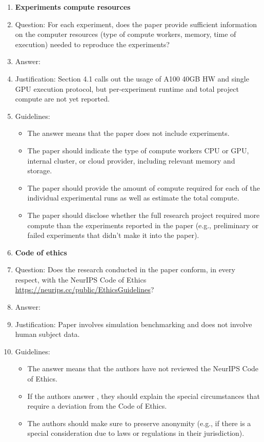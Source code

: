 \documentclass{article}
\begin{document}
\begin{enumerate}
\item {\bf Experiments compute resources}
    \item[] Question: For each experiment, does the paper provide sufficient information on the computer resources (type of compute workers, memory, time of execution) needed to reproduce the experiments?
    \item[] Answer: \answerNo{}
    \item[] Justification: Section 4.1 calls out the usage of A100 40GB HW and single GPU execution protocol, but per-experiment runtime and total project compute are not yet reported.
    \item[] Guidelines:
    \begin{itemize}
        \item The answer \answerNA{} means that the paper does not include experiments.
        \item The paper should indicate the type of compute workers CPU or GPU, internal cluster, or cloud provider, including relevant memory and storage.
        \item The paper should provide the amount of compute required for each of the individual experimental runs as well as estimate the total compute.
        \item The paper should disclose whether the full research project required more compute than the experiments reported in the paper (e.g., preliminary or failed experiments that didn't make it into the paper).
    \end{itemize}

\item {\bf Code of ethics}
    \item[] Question: Does the research conducted in the paper conform, in every respect, with the NeurIPS Code of Ethics \url{https://neurips.cc/public/EthicsGuidelines}?
    \item[] Answer: \answerYes{}
    \item[] Justification: Paper involves simulation benchmarking and does not involve human subject data.
    \item[] Guidelines:
    \begin{itemize}
        \item The answer \answerNA{} means that the authors have not reviewed the NeurIPS Code of Ethics.
        \item If the authors answer \answerNo, they should explain the special circumstances that require a deviation from the Code of Ethics.
        \item The authors should make sure to preserve anonymity (e.g., if there is a special consideration due to laws or regulations in their jurisdiction).
    \end{itemize}



\end{enumerate}
\end{document}

